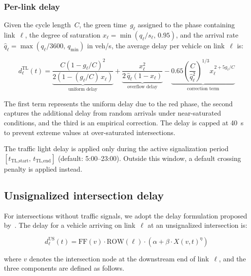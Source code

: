 \subsubsection{Per-link delay}

Given the cycle length~$C$, the green time~$g_\ell$ assigned to the phase containing link~$\ell$, the degree of saturation $x_\ell = \min(q_\ell / s_\ell, \, 0.95)$, and the arrival rate $\hat{q}_\ell = \max(q_\ell / 3600, \, q_{\min})$ in veh/s, the average delay per vehicle on link~$\ell$ is:

\begin{equation}
    d_\ell^{\text{TL}}(t) = \underbrace{\frac{C \left(1 - g_\ell/C\right)^2}{2\left(1 - (g_\ell/C) \, x_\ell\right)}}_{\text{uniform delay}}
    + \underbrace{\frac{x_\ell^2}{2 \, \hat{q}_\ell \left(1 - x_\ell\right)}}_{\text{overflow delay}}
    - \underbrace{0.65 \left(\frac{C}{\hat{q}_\ell^2}\right)^{1/3} x_\ell^{\,2 + 5 g_\ell / C}}_{\text{correction term}}
    \label{eq:webster_delay}
\end{equation}

The first term represents the uniform delay due to the red phase, the second captures the additional delay from random arrivals under near-saturated conditions, and the third is an empirical correction. The delay is capped at 40~s to prevent extreme values at over-saturated intersections.

The traffic light delay is applied only during the active signalization period $[t_{\text{TL,start}}, \, t_{\text{TL,end}}]$ (default: 5:00--23:00). Outside this window, a default crossing penalty is applied instead.

\subsection{Unsignalized intersection delay}
\label{sec:unsignalized_delay}

For intersections without traffic signals, we adopt the delay formulation proposed by~\cite{unsignalizedDelayFormula}. The delay for a vehicle arriving on link~$\ell$ at an unsignalized intersection is:

\begin{equation}
    d_\ell^{\text{US}}(t) = \text{FF}(v) \cdot \text{ROW}(\ell) \cdot \left(\alpha + \beta \cdot X(v,t)^{\eta}\right)
    \label{eq:shahpar_delay}
\end{equation}

\noindent where $v$ denotes the intersection node at the downstream end of link~$\ell$, and the three components are defined as follows.

